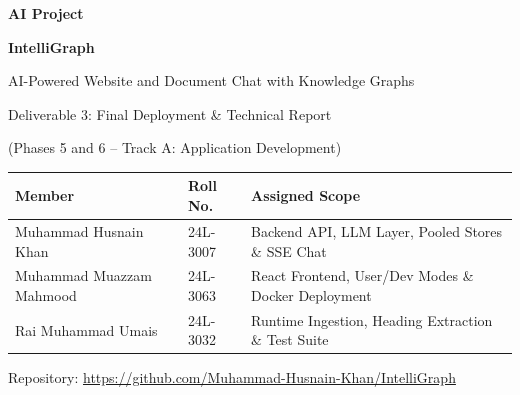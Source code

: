 \documentclass[11pt,a4paper]{article}
\begin{document}
\begin{titlepage}
\centering
\vspace*{2cm}
{\Large\bfseries AI Project\par}
\vspace{0.6cm}
{\Huge\bfseries IntelliGraph\par}
\vspace{0.3cm}
{\Large AI-Powered Website and Document Chat with Knowledge Graphs\par}
\vspace{1.2cm}
{\LARGE Deliverable 3: Final Deployment \& Technical Report\par}
\vspace{0.4cm}
{\Large (Phases 5 and 6 -- Track A: Application Development)\par}
\vspace{1.5cm}
\begin{tabular}{lll}
\toprule
\textbf{Member} & \textbf{Roll No.} & \textbf{Assigned Scope} \\
\midrule
Muhammad Husnain Khan & 24L-3007 & Backend API, LLM Layer, Pooled Stores \& SSE Chat \\
Muhammad Muazzam Mahmood & 24L-3063 & React Frontend, User/Dev Modes \& Docker Deployment \\
Rai Muhammad Umais & 24L-3032 & Runtime Ingestion, Heading Extraction \& Test Suite \\
\bottomrule
\end{tabular}
\vspace{1.5cm}

Repository: \url{https://github.com/Muhammad-Husnain-Khan/IntelliGraph}
\vfill
\end{titlepage}
\end{document}
